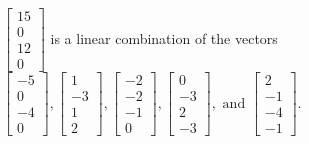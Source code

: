 \begin{exercise}
\begin{exerciseStatement}
  \end{exerciseStatement}
  \begin{exerciseAnswer}
   \(\left[\begin{array}{c}
15 \\
0 \\
12 \\
0
\end{array}\right]\) 
  	 is  
	a linear combination of the vectors \(\left[\begin{array}{c}
-5 \\
0 \\
-4 \\
0
\end{array}\right] , \left[\begin{array}{c}
1 \\
-3 \\
1 \\
2
\end{array}\right] , \left[\begin{array}{c}
-2 \\
-2 \\
-1 \\
0
\end{array}\right] , \left[\begin{array}{c}
0 \\
-3 \\
2 \\
-3
\end{array}\right] , \text{ and } \left[\begin{array}{c}
2 \\
-1 \\
-4 \\
-1
\end{array}\right]\).

	
  


  \end{exerciseAnswer}
\end{exercise}